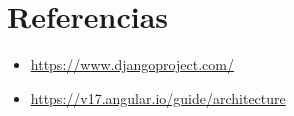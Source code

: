\documentclass{article}
\begin{document}
	
  \newpage
  \section{Referencias}
  \begin{itemize}
    \item \url{https://www.djangoproject.com/}
    \item \url{https://v17.angular.io/guide/architecture}
  \end{itemize}

%
%
%
			
\end{document}
